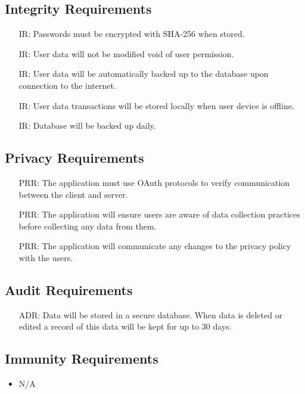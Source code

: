 \documentclass{article}
\newcounter{IRnum}
\newcounter{PRRnum}
\newcounter{ADRnum}
\begin{document}
	\subsection{Integrity Requirements}
	\noindent 
	\begin{itemize}
		\item[IR\refstepcounter{IRnum}\theIRnum:]
		Passwords must be encrypted with SHA-256 when stored.
		\item[IR\refstepcounter{IRnum}\theIRnum:]
		User data will not be modified void of user permission.
		\item[IR\refstepcounter{IRnum}\theIRnum:]
		User data will be automatically backed up to the database upon connection to the internet.
		\item[IR\refstepcounter{IRnum}\theIRnum:]
		User data transactions will be stored locally when user device is offline.
		\item[IR\refstepcounter{IRnum}\theIRnum:]
		Database will be backed up daily.
	\end{itemize}
	\subsection{Privacy Requirements}
	\noindent 
	\begin{itemize}
		\item[PRR\refstepcounter{PRRnum}\thePRRnum:]
		The application must use OAuth protocols to verify communication between the client and server.
		\item[PRR\refstepcounter{PRRnum}\thePRRnum:]
		The application will ensure users are aware of data collection practices before collecting any data from them.
		\item[PRR\refstepcounter{PRRnum}\thePRRnum:]
		The application will communicate any changes to the privacy policy with the users.	
	\end{itemize}
	\subsection{Audit Requirements}
	\noindent
	\begin{itemize}
		\item[ADR\refstepcounter{ADRnum}\theADRnum:]
		Data will be stored in a secure database. When data is deleted or edited a record of this data will be kept for up to 30 days.
	\end{itemize}
	\subsection{Immunity Requirements}
	\noindent 
	\begin{itemize}
		\item N/A
	\end{itemize}
	\newpage
	
\end{document}
